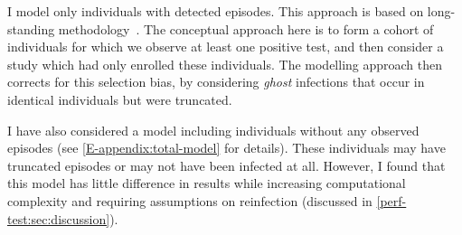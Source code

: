 \documentclass[thesis.tex]{subfiles}
\begin{document}
I model only individuals with detected episodes.
This approach is based on long-standing methodology~\autocites{heiseyModelling}{dempsterMaximum}{turnbullEmpirical}.
The conceptual approach here is to form a cohort of individuals for which we observe at least one positive test, and then consider a study which had only enrolled these individuals.
The modelling approach then corrects for this selection bias, by considering \emph{ghost} infections that occur in identical individuals but were truncated.

I have also considered a model including individuals without any observed episodes (see \cref{E-appendix:total-model} for details).
These individuals may have truncated episodes or may not have been infected at all.
However, I found that this model has little difference in results while increasing computational complexity and requiring assumptions on reinfection (discussed in \cref{perf-test:sec:discussion}).
\end{document}
